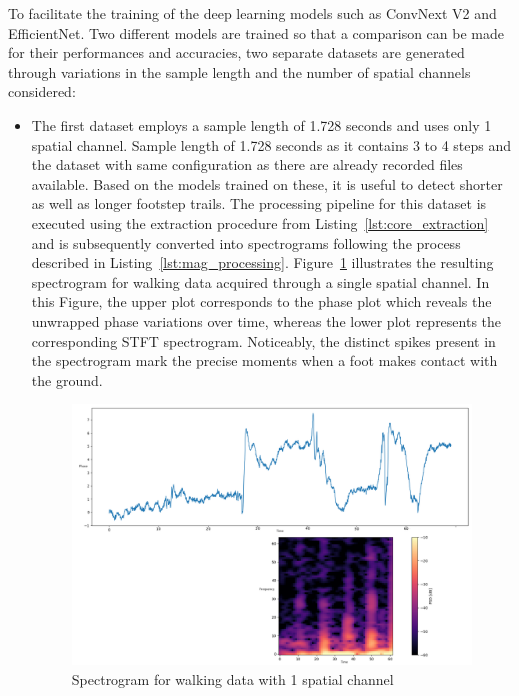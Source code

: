 To facilitate the training of the deep learning models such as ConvNext V2 and EfficientNet. Two different models are trained so that a comparison can be made for their performances and accuracies, two separate datasets are generated through variations in the sample length and the number of spatial channels considered:
\begin{itemize}
    \item The first dataset employs a sample length of 1.728 seconds and uses only 1 spatial channel. Sample length of 1.728 seconds as it contains 3 to 4 steps and the dataset with same configuration as there are already recorded files available. Based on the models trained on these, it is useful to detect shorter as well as longer footstep trails. The processing pipeline for this dataset is executed using the extraction procedure from Listing~\ref{lst:core_extraction} and is subsequently converted into spectrograms following the process described in Listing~\ref{lst:mag_processing}. Figure~\ref{walking_1ch} illustrates the resulting spectrogram for walking data acquired through a single spatial channel. In this Figure, the upper plot corresponds to the phase plot which reveals the unwrapped phase variations over time, whereas the lower plot represents the corresponding STFT spectrogram. Noticeably, the distinct spikes present in the spectrogram mark the precise moments when a foot makes contact with the ground.
    
    \begin{figure}[h]
        \centering
        \includegraphics[width=0.8\linewidth]{Bilder/jpg/walking_1ch.png}
        \caption{Spectrogram for walking data with 1 spatial channel}
        \label{walking_1ch}
    \end{figure}


\end{itemize}

